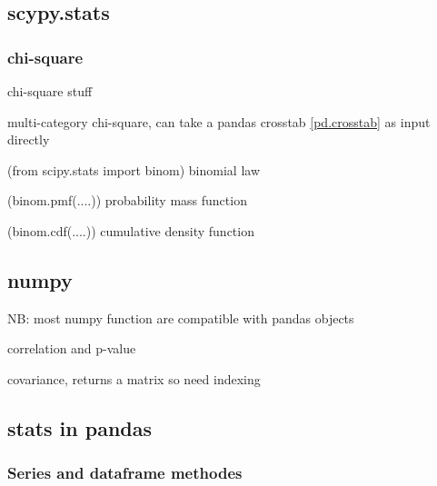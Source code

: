 	\subsection{scypy.stats}





		\subsubsection{chi-square}

			 chi-square stuff

			 multi-category chi-square, can take a pandas crosstab \ref{pd.crosstab} as input directly


			\code(from scipy.stats import binom) binomial law

			\code(binom.pmf(....)) probability mass function

			\code(binom.cdf(....)) cumulative density function



	\subsection{numpy}

		NB: most numpy function are compatible with pandas objects
		


		 correlation and p-value

		 covariance, returns a matrix so need indexing


	\subsection{stats in pandas}
		
		\subsubsection{Series and dataframe methodes}

